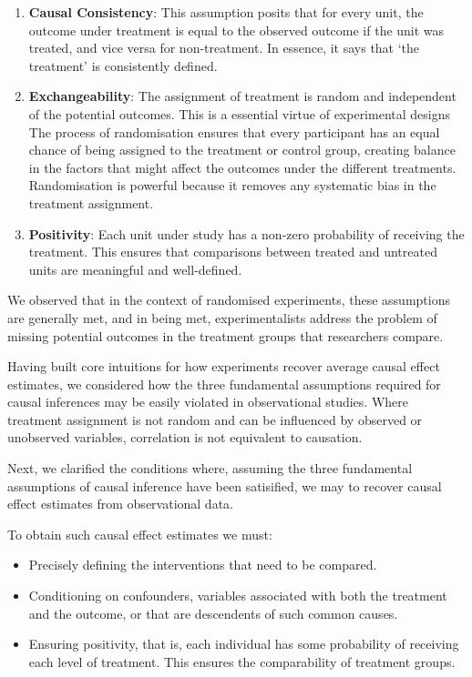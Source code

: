 \documentclass[
  singlecolumn]{article}
\providecommand{\tightlist}{%
  \setlength{\itemsep}{0pt}\setlength{\parskip}{0pt}}\usepackage{longtable,booktabs,array}
\begin{document}
\begin{enumerate}
\def\labelenumi{\arabic{enumi}.}
\item
  \textbf{Causal Consistency}: This assumption posits that for every
  unit, the outcome under treatment is equal to the observed outcome if
  the unit was treated, and vice versa for non-treatment. In essence, it
  says that `the treatment' is consistently defined.
\item
  \textbf{Exchangeability}: The assignment of treatment is random and
  independent of the potential outcomes. This is a essential virtue of
  experimental designs The process of randomisation ensures that every
  participant has an equal chance of being assigned to the treatment or
  control group, creating balance in the factors that might affect the
  outcomes under the different treatments. Randomisation is powerful
  because it removes any systematic bias in the treatment assignment.
\item
  \textbf{Positivity}: Each unit under study has a non-zero probability
  of receiving the treatment. This ensures that comparisons between
  treated and untreated units are meaningful and well-defined.
\end{enumerate}

We observed that in the context of randomised experiments, these
assumptions are generally met, and in being met, experimentalists
address the problem of missing potential outcomes in the treatment
groups that researchers compare.

Having built core intuitions for how experiments recover average causal
effect estimates, we considered how the three fundamental assumptions
required for causal inferences may be easily violated in observational
studies. Where treatment assignment is not random and can be influenced
by observed or unobserved variables, correlation is not equivalent to
causation.

Next, we clarified the conditions where, assuming the three fundamental
assumptions of causal inference have been satisified, we may to recover
causal effect estimates from observational data.

To obtain such causal effect estimates we must:

\begin{itemize}
\tightlist
\item
  Precisely defining the interventions that need to be compared.
\item
  Conditioning on confounders, variables associated with both the
  treatment and the outcome, or that are descendents of such common
  causes.
\item
  Ensuring positivity, that is, each individual has some probability of
  receiving each level of treatment. This ensures the comparability of
  treatment groups.
\end{itemize}
\end{document}
